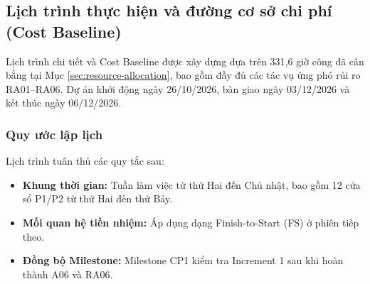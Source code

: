 \subsection{Lịch trình thực hiện và đường cơ sở chi phí (Cost Baseline)}
\label{sec:schedule-baseline}
Lịch trình chi tiết và Cost Baseline được xây dựng dựa trên 331,6 giờ công đã cân bằng tại Mục \ref{sec:resource-allocation}, bao gồm đầy đủ các tác vụ ứng phó rủi ro RA01--RA06. Dự án khởi động ngày 26/10/2026, bàn giao ngày 03/12/2026 và kết thúc ngày 06/12/2026.
\subsubsection{Quy ước lập lịch}
Lịch trình tuân thủ các quy tắc sau:
\begin{itemize}
    \item \textbf{Khung thời gian:} Tuần làm việc từ thứ Hai đến Chủ nhật, bao gồm 12 cửa sổ P1/P2 từ thứ Hai đến thứ Bảy.
    \item \textbf{Mối quan hệ tiền nhiệm:} Áp dụng dạng Finish-to-Start (FS) ở phiên tiếp theo.
    \item \textbf{Đồng bộ Milestone:} Milestone CP1 kiểm tra Increment 1 sau khi hoàn thành A06 và RA06.
\end{itemize}
